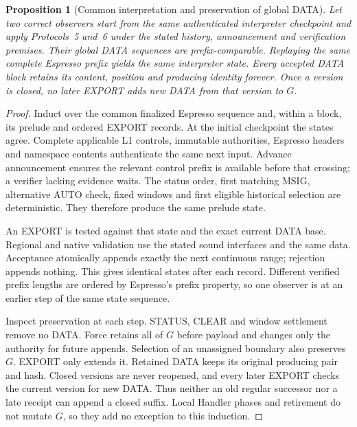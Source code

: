 \documentclass[11pt,a4paper]{article}
\newtheorem{proposition}[proposition]{Proposition}
\begin{document}
\begin{proposition}[Common interpretation and preservation of global DATA]
\label{prop:global-prefix}
Let two correct observers start from the same authenticated interpreter
checkpoint and apply Protocols~5 and~6 under the stated history,
announcement and verification premises. Their global DATA sequences are
prefix-comparable. Replaying the same complete Espresso prefix yields
the same interpreter state. Every accepted DATA block retains its content,
position and producing identity forever. Once a version is closed, no
later EXPORT adds new DATA from that version to $G$.
\end{proposition}
\begin{proof}
Induct over the common finalized Espresso sequence and, within a block,
its prelude and ordered EXPORT records. At the initial checkpoint the
states agree. Complete applicable L1 controls, immutable authorities,
Espresso headers and namespace contents authenticate the same next
input. Advance announcement ensures the relevant control prefix is
available before that crossing; a verifier lacking evidence waits.
The status order, first matching MSIG, alternative AUTO check, fixed
windows and first eligible historical selection are deterministic.
They therefore produce the same prelude state.

An EXPORT is tested against that state and the exact current DATA base.
Regional and native validation use the stated sound interfaces and the
same data. Acceptance atomically appends exactly the next continuous
range; rejection appends nothing. This gives identical states after
each record. Different verified prefix lengths are ordered by Espresso's
prefix property, so one observer is at an earlier step of the same
state sequence.

Inspect preservation at each step. STATUS, CLEAR and window settlement
remove no DATA. Force retains all of $G$ before payload and changes only
the authority for future appends. Selection of an unassigned boundary
also preserves $G$. EXPORT only extends it. Retained DATA keeps its
original producing pair and hash. Closed versions are never reopened,
and every later EXPORT checks the current version for new DATA. Thus
neither an old regular successor nor a late receipt can append a closed
suffix. Local Handler phases and retirement do not mutate $G$, so they
add no exception to this induction.
\end{proof}
\end{document}
